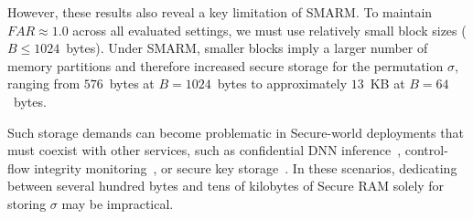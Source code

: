 \documentclass[journal]{IEEEtran}
\begin{document}
However, these results also reveal a key limitation of SMARM.
To maintain $FAR \approx 1.0$ across all evaluated settings, we must use relatively small block sizes ($B \leq 1024$~bytes).
Under SMARM, smaller blocks imply a larger number of memory partitions and therefore increased secure storage for the permutation $\sigma$, ranging from $576$~bytes at $B = 1024$~bytes to approximately $13$~KB at $B = 64$~bytes.

Such storage demands can become problematic in Secure-world deployments that must coexist with other services, such as confidential DNN inference~\cite{tslices}, control-flow integrity monitoring~\cite{tzmcfi}, or secure key storage~\cite{silabs-secure-key-storage}.
In these scenarios, dedicating between several hundred bytes and tens of kilobytes of Secure RAM solely for storing $\sigma$ may be impractical.
\end{document}

